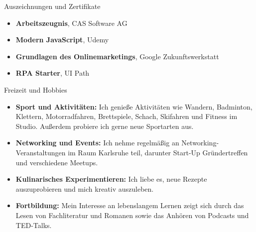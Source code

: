 \documentclass{resume} %
\begin{document}
\newpage

\begin{rSection}{Auszeichnungen und Zertifikate}
    \vspace{0.5em}

    \begin{itemize}
        \item \textbf{Arbeitszeugnis}, CAS Software AG
        \item \textbf{Modern JavaScript}, Udemy
        \item \textbf{Grundlagen des Onlinemarketings}, Google Zukunftswerkstatt
        \item \textbf{RPA Starter}, UI Path
    \end{itemize}


\end{rSection}


\begin{rSection}{Freizeit und Hobbies}
    \vspace{0.5em}
    \begin{itemize}
        \item \raggedright{\textbf{Sport und Aktivitäten:} Ich genieße Aktivitäten wie Wandern, Badminton, Klettern, Motorradfahren, Brettspiele, Schach, Skifahren und Fitness im Studio. Außerdem probiere ich gerne neue Sportarten aus.}
        \item \raggedright{\textbf{Networking und Events:} Ich nehme regelmäßig an Networking-Veranstaltungen im Raum Karlsruhe teil, darunter Start-Up Gründertreffen und verschiedene Meetups.}
        \item \raggedright{\textbf{Kulinarisches Experimentieren:} Ich liebe es, neue Rezepte auszuprobieren und mich kreativ auszuleben.} 
        \item \raggedright{\textbf{Fortbildung:} Mein Interesse an lebenslangem Lernen zeigt sich durch das Lesen von Fachliteratur und Romanen sowie das Anhören von Podcasts und TED-Talks.}
    \end{itemize}


\end{rSection}
\end{document}
